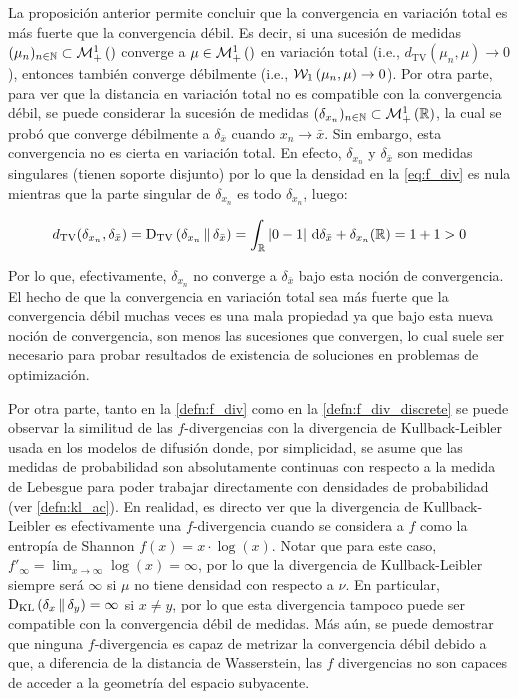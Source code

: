 La proposición anterior permite concluir que la convergencia en variación total es más fuerte que la convergencia débil. Es decir, si una sucesión de medidas $(\mu_n)_{n\in\mathbb{N}}\subset\mathcal{M}_+^1\left(\right)$ converge a $\mu\in\mathcal{M}_+^1\left(\right)$ en variación total (i.e., $d_{\operatorname{TV}}(\mu_n,\mu)\to 0$), entonces también converge débilmente (i.e., $\mathcal{W}_{1}\left(\mu_n,\mu\right)\to 0$). Por otra parte, para ver que la distancia en variación total no es compatible con la convergencia débil, se puede considerar la sucesión de medidas $(\delta_{x_n})_{n\in\mathbb{N}}\subset\mathcal{M}_+^1\left(\mathbb{R}\right)$, la cual se probó que converge débilmente a $\delta_{\bar x}$ cuando $x_n\to\bar x$. Sin embargo, esta convergencia no es cierta en variación total. En efecto, $\delta_{x_n}$ y $\delta_{\bar x}$ son medidas singulares (tienen soporte disjunto) por lo que la densidad en la \eqref{eq:f_div} es nula mientras que la parte singular de $\delta_{x_n}$ es todo $\delta_{x_n}$, luego:

\begin{equation}
	d_{\operatorname{TV}}(\delta_{x_n},\delta_{\bar x})
	= \operatorname{D_{TV}}\left(\delta_{x_n}\,\|\,\delta_{\bar x}\right)
	= \int_{\mathbb{R}} |0 - 1| \,\operatorname{d}\!\delta_{\bar x} + \delta_{x_n}(\mathbb{R})
	= 1 + 1 > 0
\end{equation}

Por lo que, efectivamente, $\delta_{x_n}$ no converge a $\delta_{\bar x}$ bajo esta noción de convergencia. El hecho de que la convergencia en variación total sea más fuerte que la convergencia débil muchas veces es una mala propiedad ya que bajo esta nueva noción de convergencia, son menos las sucesiones que convergen, lo cual suele ser necesario para probar resultados de existencia de soluciones en problemas de optimización.

Por otra parte, tanto en la \autoref{defn:f_div} como en la \autoref{defn:f_div_discrete} se puede observar la similitud de las $f$-divergencias con la divergencia de Kullback-Leibler usada en los modelos de difusión donde, por simplicidad, se asume que las medidas de probabilidad son absolutamente continuas con respecto a la medida de Lebesgue para poder trabajar directamente con densidades de probabilidad (ver \autoref{defn:kl_ac}). En realidad, es directo ver que la divergencia de Kullback-Leibler es efectivamente una $f$-divergencia cuando se considera a $f$ como la entropía de Shannon $f(x)=x\cdot\log(x)$. Notar que para este caso, $f'_\infty = \lim_{x\to\infty} \log(x) = \infty$, por lo que la divergencia de Kullback-Leibler siempre será $\infty$ si $\mu$ no tiene densidad con respecto a $\nu$. En particular, $\operatorname{D_{KL}}\left(\delta_x\,\|\,\delta_y\right)=\infty$ si $x\neq y$, por lo que esta divergencia tampoco puede ser compatible con la convergencia débil de medidas. Más aún, se puede demostrar que ninguna $f$-divergencia es capaz de metrizar la convergencia débil debido a que, a diferencia de la distancia de Wasserstein, las $f$ divergencias no son capaces de acceder a la geometría del espacio subyacente.

